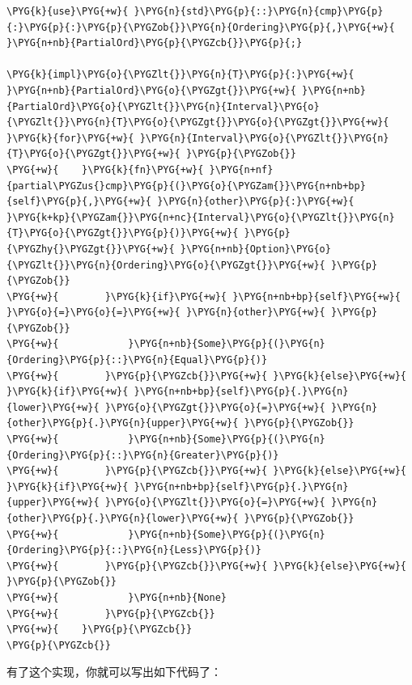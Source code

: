 \begin{Verbatim}[commandchars=\\\{\},breaklines=true,breakanywhere=true,fontsize=\codefont,xleftmargin=17bp]
\PYG{k}{use}\PYG{+w}{ }\PYG{n}{std}\PYG{p}{::}\PYG{n}{cmp}\PYG{p}{:}\PYG{p}{:}\PYG{p}{\PYGZob{}}\PYG{n}{Ordering}\PYG{p}{,}\PYG{+w}{ }\PYG{n+nb}{PartialOrd}\PYG{p}{\PYGZcb{}}\PYG{p}{;}

\PYG{k}{impl}\PYG{o}{\PYGZlt{}}\PYG{n}{T}\PYG{p}{:}\PYG{+w}{ }\PYG{n+nb}{PartialOrd}\PYG{o}{\PYGZgt{}}\PYG{+w}{ }\PYG{n+nb}{PartialOrd}\PYG{o}{\PYGZlt{}}\PYG{n}{Interval}\PYG{o}{\PYGZlt{}}\PYG{n}{T}\PYG{o}{\PYGZgt{}}\PYG{o}{\PYGZgt{}}\PYG{+w}{ }\PYG{k}{for}\PYG{+w}{ }\PYG{n}{Interval}\PYG{o}{\PYGZlt{}}\PYG{n}{T}\PYG{o}{\PYGZgt{}}\PYG{+w}{ }\PYG{p}{\PYGZob{}}
\PYG{+w}{    }\PYG{k}{fn}\PYG{+w}{ }\PYG{n+nf}{partial\PYGZus{}cmp}\PYG{p}{(}\PYG{o}{\PYGZam{}}\PYG{n+nb+bp}{self}\PYG{p}{,}\PYG{+w}{ }\PYG{n}{other}\PYG{p}{:}\PYG{+w}{ }\PYG{k+kp}{\PYGZam{}}\PYG{n+nc}{Interval}\PYG{o}{\PYGZlt{}}\PYG{n}{T}\PYG{o}{\PYGZgt{}}\PYG{p}{)}\PYG{+w}{ }\PYG{p}{\PYGZhy{}\PYGZgt{}}\PYG{+w}{ }\PYG{n+nb}{Option}\PYG{o}{\PYGZlt{}}\PYG{n}{Ordering}\PYG{o}{\PYGZgt{}}\PYG{+w}{ }\PYG{p}{\PYGZob{}}
\PYG{+w}{        }\PYG{k}{if}\PYG{+w}{ }\PYG{n+nb+bp}{self}\PYG{+w}{ }\PYG{o}{=}\PYG{o}{=}\PYG{+w}{ }\PYG{n}{other}\PYG{+w}{ }\PYG{p}{\PYGZob{}}
\PYG{+w}{            }\PYG{n+nb}{Some}\PYG{p}{(}\PYG{n}{Ordering}\PYG{p}{::}\PYG{n}{Equal}\PYG{p}{)}
\PYG{+w}{        }\PYG{p}{\PYGZcb{}}\PYG{+w}{ }\PYG{k}{else}\PYG{+w}{ }\PYG{k}{if}\PYG{+w}{ }\PYG{n+nb+bp}{self}\PYG{p}{.}\PYG{n}{lower}\PYG{+w}{ }\PYG{o}{\PYGZgt{}}\PYG{o}{=}\PYG{+w}{ }\PYG{n}{other}\PYG{p}{.}\PYG{n}{upper}\PYG{+w}{ }\PYG{p}{\PYGZob{}}
\PYG{+w}{            }\PYG{n+nb}{Some}\PYG{p}{(}\PYG{n}{Ordering}\PYG{p}{::}\PYG{n}{Greater}\PYG{p}{)}
\PYG{+w}{        }\PYG{p}{\PYGZcb{}}\PYG{+w}{ }\PYG{k}{else}\PYG{+w}{ }\PYG{k}{if}\PYG{+w}{ }\PYG{n+nb+bp}{self}\PYG{p}{.}\PYG{n}{upper}\PYG{+w}{ }\PYG{o}{\PYGZlt{}}\PYG{o}{=}\PYG{+w}{ }\PYG{n}{other}\PYG{p}{.}\PYG{n}{lower}\PYG{+w}{ }\PYG{p}{\PYGZob{}}
\PYG{+w}{            }\PYG{n+nb}{Some}\PYG{p}{(}\PYG{n}{Ordering}\PYG{p}{::}\PYG{n}{Less}\PYG{p}{)}
\PYG{+w}{        }\PYG{p}{\PYGZcb{}}\PYG{+w}{ }\PYG{k}{else}\PYG{+w}{ }\PYG{p}{\PYGZob{}}
\PYG{+w}{            }\PYG{n+nb}{None}
\PYG{+w}{        }\PYG{p}{\PYGZcb{}}
\PYG{+w}{    }\PYG{p}{\PYGZcb{}}
\PYG{p}{\PYGZcb{}}
\end{Verbatim}

有了这个实现，你就可以写出如下代码了：

